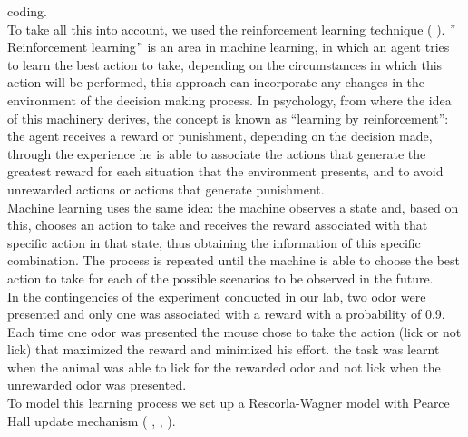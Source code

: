 coding.\\To take all this into account, we used the reinforcement learning technique (\cite{RescorlaWagner} \cite{Sutton} \cite{SuttonBarto}). $"$Reinforcement learning$"$ is an area in machine learning, in which an agent tries to learn the best action to take, depending on the circumstances in which this action will be performed, this approach can incorporate any changes in the environment of the decision making process. In psychology, from where the idea of this machinery derives, the concept is known as “learning by reinforcement”: the agent receives a reward or punishment, depending on the decision made, through the experience he is able to associate the actions that generate the greatest reward for each situation that the environment presents, and to avoid unrewarded actions or actions that generate punishment.\\
Machine learning uses the same idea: the machine observes a state and, based on this, chooses an action to take and receives the reward associated with that specific action in that state, thus obtaining the information of this specific combination. The process is repeated until the machine is able to choose the best action to take for each of the possible scenarios to be observed in the future.\\In the contingencies of the experiment conducted in our lab, two odor were presented and only one was associated with a reward with a probability of 0.9. Each time one odor was presented the mouse chose to take the action (lick or not lick) that maximized the reward and minimized his effort. the task was learnt when the animal was able to lick for the rewarded odor and not lick when the unrewarded odor was presented.\\To model this learning process we set up a Rescorla-Wagner model with Pearce Hall update mechanism (\cite{RescorlaWagner} \cite{PearceHall} \cite{Li}, \cite{Costa}, \cite{Koppe}).\\

